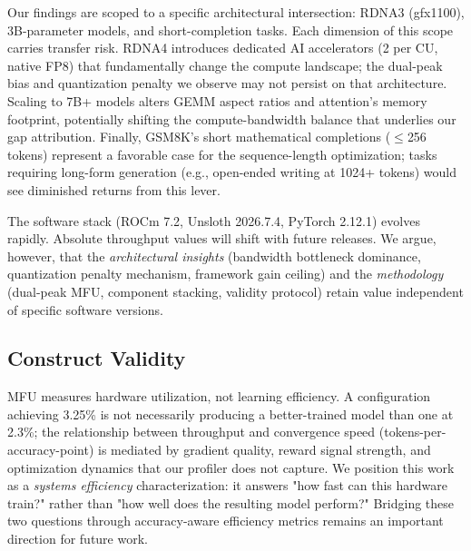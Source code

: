 Our findings are scoped to a specific architectural intersection: RDNA3 (gfx1100), 3B-parameter models, and short-completion tasks. Each dimension of this scope carries transfer risk. RDNA4 introduces dedicated AI accelerators (2 per CU, native FP8) that fundamentally change the compute landscape; the dual-peak bias and quantization penalty we observe may not persist on that architecture. Scaling to 7B+ models alters GEMM aspect ratios and attention's memory footprint, potentially shifting the compute-bandwidth balance that underlies our gap attribution. Finally, GSM8K's short mathematical completions ($\leq$256 tokens) represent a favorable case for the sequence-length optimization; tasks requiring long-form generation (e.g., open-ended writing at 1024+ tokens) would see diminished returns from this lever.

The software stack (ROCm 7.2, Unsloth 2026.7.4, PyTorch 2.12.1) evolves rapidly. Absolute throughput values will shift with future releases. We argue, however, that the \emph{architectural insights} (bandwidth bottleneck dominance, quantization penalty mechanism, framework gain ceiling) and the \emph{methodology} (dual-peak MFU, component stacking, validity protocol) retain value independent of specific software versions.

\subsection{Construct Validity}

MFU measures hardware utilization, not learning efficiency. A configuration achieving 3.25\% \mfuprac{} is not necessarily producing a better-trained model than one at 2.3\%; the relationship between throughput and convergence speed (tokens-per-accuracy-point) is mediated by gradient quality, reward signal strength, and optimization dynamics that our profiler does not capture. We position this work as a \emph{systems efficiency} characterization: it answers "how fast can this hardware train?" rather than "how well does the resulting model perform?" Bridging these two questions through accuracy-aware efficiency metrics remains an important direction for future work.
